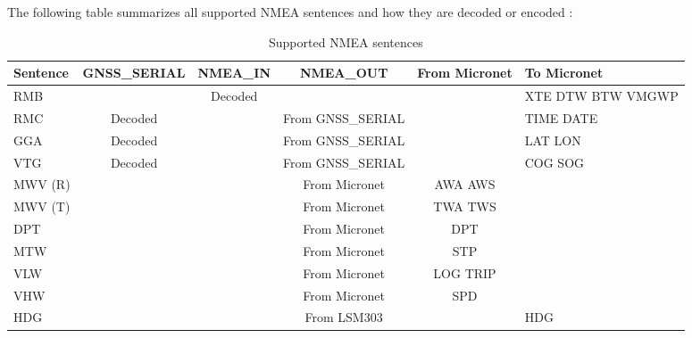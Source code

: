 \documentclass{report}
\begin{document}
The following table summarizes all supported NMEA sentences and how they are decoded or encoded :

\begin{table}[h]
	\small
	\begin{tabular}{|l|c|c|c|c|p{2.5cm}|}
		\hline
		\textbf{Sentence} & \textbf{GNSS\_SERIAL}  & \textbf{NMEA\_IN} & \textbf{NMEA\_OUT} & \textbf{From Micronet} & \textbf{To Micronet} \\
		\hline
		RMB & & Decoded & & & XTE DTW BTW VMGWP \\
		\hline
		RMC & Decoded & & From GNSS\_SERIAL & & TIME DATE \\
		\hline
		GGA & Decoded & & From GNSS\_SERIAL & & LAT LON \\
		\hline
		VTG & Decoded & & From GNSS\_SERIAL & & COG SOG \\
		\hline
		MWV (R) & & & From Micronet & AWA AWS & \\
		\hline
		MWV (T) & & & From Micronet & TWA TWS & \\
		\hline
		DPT & & & From Micronet & DPT & \\
		\hline
		MTW & & & From Micronet & STP & \\
		\hline
		VLW & & & From Micronet & LOG TRIP & \\
		\hline
		VHW & & & From Micronet & SPD & \\
		\hline
		HDG & & & From LSM303 & & HDG \\
		\hline
	\end{tabular}
	\caption{Supported NMEA sentences}
	\label{table:nmeasentences}
\end{table}
\end{document}
